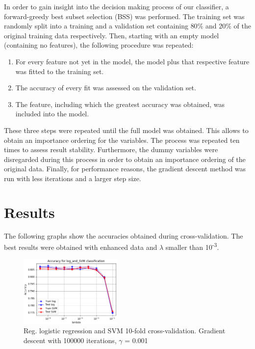 \documentclass[10pt,conference,compsocconf]{IEEEtran}
\begin{document}
\par
In order to gain insight into the decision making process of our classifier, a forward-greedy best subset selection (BSS) was performed. The training set was randomly split into a training and a validation set containing $80\%$ and $20\%$ of the original training data respectively. Then, starting with an empty model (containing no features), the following procedure was repeated: 
\begin{enumerate}
	\item For every feature not yet in the model, the model plus that respective feature was fitted to the training set.
	\item The accuracy of every fit was assessed on the validation set.  
	\item The feature, including which the greatest accuracy was obtained, was included into the model.
\end{enumerate}
These three steps were repeated until the full model was obtained. This allows to obtain an importance ordering for the variables. The process was repeated ten times to assess result stability. Furthermore, the dummy variables were disregarded during this process in order to obtain an importance ordering of the original data. Finally, for performance reasons, the gradient descent method was run with less iterations and a larger step size.
\section*{Results}
The following graphs show the accuracies obtained during cross-validation. The best results were obtained with enhanced data and $\lambda$ smaller than 10\textsuperscript{-3}. 
\begin{figure}[H]
	\centering
	\includegraphics[width=0.45\textwidth]{accuracy_log_and_SVM.png}
	\caption{Reg. logistic regression and SVM 10-fold cross-validation. Gradient descent with 100000 iterations, $\gamma$ = 0.001}
\end{figure}
\end{document}
